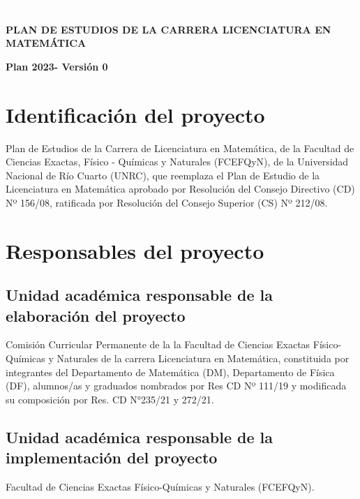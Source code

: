 \documentclass[a4paper, 12pt]{article}
\begin{document}
 
 
 \textcolor{white}{a}   
 \vspace{3cm}
 
\begin{center}
 \textbf{PLAN DE ESTUDIOS DE LA CARRERA LICENCIATURA EN MATEMÁTICA}
 
\textbf{Plan 2023- Versión 0}
\end{center}


 
 \newpage



\tableofcontents

\newpage


\section{Identificación del proyecto}  

Plan de Estudios de la 
Carrera de Licenciatura en Matemática, de la Facultad de Ciencias Exactas, 
Físico - Químicas y Naturales (FCEFQyN), de la Universidad Nacional de Río Cuarto (UNRC), que  reemplaza el Plan de Estudio de la Licenciatura en Matemática aprobado por Resolución del Consejo Directivo (CD) Nº 156/08, 
ratificada por Resolución del Consejo Superior (CS) Nº 212/08.


\section{Responsables del proyecto}

\subsection{Unidad académica responsable de la elaboración del proyecto}

Comisión Curricular Permanente de la 
la Facultad de Ciencias Exactas Físico-Químicas y Naturales de la carrera Licenciatura en Matemática, constituida por integrantes del Departamento de Matemática (DM), Departamento de Física (DF), alumnos/as y graduados nombrados por Res CD Nº  111/19 y modificada su composición por Res. CD N°235/21 y 272/21.  


\subsection{Unidad académica responsable de la implementación del proyecto}

Facultad de Ciencias Exactas Físico-Químicas y Naturales (FCEFQyN). 
\end{document}
